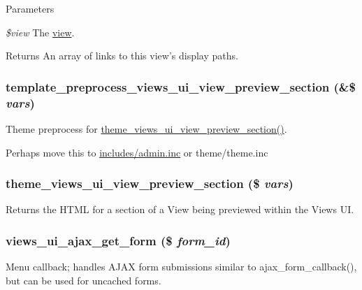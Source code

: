 \begin{DoxyParams}{Parameters}
\item[{\em \$view}]The \hyperlink{classview}{view}.\end{DoxyParams}
\begin{DoxyReturn}{Returns}
An array of links to this view's display paths. 
\end{DoxyReturn}
\hypertarget{views__ui_8module_aa7dae7204d3172c008b70fb345f5738c}{
\subsubsection[{template\_\-preprocess\_\-views\_\-ui\_\-view\_\-preview\_\-section}]{\setlength{\rightskip}{0pt plus 5cm}template\_\-preprocess\_\-views\_\-ui\_\-view\_\-preview\_\-section (\&\$ {\em vars})}}
\label{views__ui_8module_aa7dae7204d3172c008b70fb345f5738c}
Theme preprocess for \hyperlink{views__ui_8module_a9c4eea67a43b66c32761d5ac40f32b70}{theme\_\-views\_\-ui\_\-view\_\-preview\_\-section()}.

Perhaps move this to \hyperlink{admin_8inc}{includes/admin.inc} or theme/theme.inc \hypertarget{views__ui_8module_a9c4eea67a43b66c32761d5ac40f32b70}{
\subsubsection[{theme\_\-views\_\-ui\_\-view\_\-preview\_\-section}]{\setlength{\rightskip}{0pt plus 5cm}theme\_\-views\_\-ui\_\-view\_\-preview\_\-section (\$ {\em vars})}}
\label{views__ui_8module_a9c4eea67a43b66c32761d5ac40f32b70}
Returns the HTML for a section of a View being previewed within the Views UI. \hypertarget{views__ui_8module_a869b55ec9965e41d8498ff9269b652b7}{
\subsubsection[{views\_\-ui\_\-ajax\_\-get\_\-form}]{\setlength{\rightskip}{0pt plus 5cm}views\_\-ui\_\-ajax\_\-get\_\-form (\$ {\em form\_\-id})}}
\label{views__ui_8module_a869b55ec9965e41d8498ff9269b652b7}
Menu callback; handles AJAX form submissions similar to ajax\_\-form\_\-callback(), but can be used for uncached forms.

